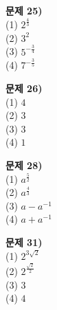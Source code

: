 \documentclass{oblivoir}
\newcommand\an[1]{\par\bigskip\noindent\textbf{문제 #1)}\\}
\begin{document}
\begin{minipage}{0.33\textwidth}

%
\an{25}
(1) \(2^{\frac43}\)\\
(2) \(3^2\)\\
(3) \(5^{-\frac34}\)\\
(4) \(7^{-\frac35}\)

%
\an{26}
(1) \(4\)\\
(2) \(3\)\\
(3) \(3\)\\
(4) \(1\)

%
\an{28}
(1) \(a^{\frac52}\)\\
(2) \(a^{\frac43}\)\\
(3) \(a-a^{-1}\)\\
(4) \(a+a^{-1}\)

%
\an{31}
(1) \(2^{3\sqrt2}\)\\
(2) \(2^{\frac{\sqrt2}2}\)\\
(3) \(3\)\\
(4) \(4\)
\end{minipage}
\end{document}
